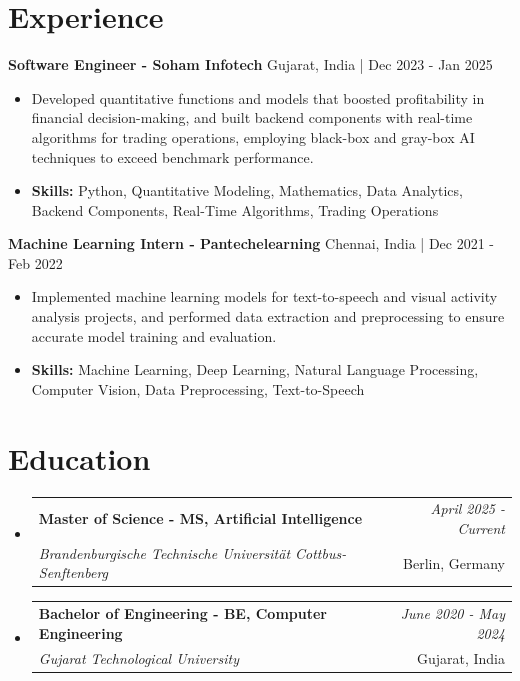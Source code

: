 \documentclass[a4paper,11pt]{article}
\makeatletter
\newcommand{\resumeSubheading}[4]{
\vspace{0.5mm}\item
    \begin{tabular*}{\linewidth}[t]{l@{\extracolsep{\fill}}r}
        \textbf{#1} & \textit{\footnotesize{#4}} \\
        \textit{\footnotesize{#3}} &  \footnotesize{#2}\\
    \end{tabular*}
    \vspace{-2.4mm}
}
\makeatother
\begin{document}
\section{\textbf{Experience}}


\vspace{1mm}
  \textbf{Software Engineer - Soham Infotech} \hfill Gujarat, India | Dec 2023 - Jan 2025
\vspace{-1.5mm} %
\begin{itemize}
  \item Developed quantitative functions and models that boosted profitability in financial decision-making, and built backend components with real-time algorithms for trading operations, employing black-box and gray-box AI techniques to exceed benchmark performance.

\vspace{-2mm}
  \item \textbf{Skills:} Python, Quantitative Modeling, Mathematics, Data Analytics, Backend Components, Real-Time Algorithms, Trading Operations
\end{itemize}

\vspace{1mm}
  \textbf{Machine Learning Intern - Pantechelearning} \hfill Chennai, India | Dec 2021 - Feb 2022
\vspace{-1.5mm} %
\begin{itemize}
  \item Implemented machine learning models for text-to-speech and visual activity analysis projects, and performed data extraction and preprocessing to ensure accurate model training and evaluation.
\vspace{-2mm}
  \item \textbf{Skills:} Machine Learning, Deep Learning, Natural Language Processing, Computer Vision, Data Preprocessing, Text-to-Speech
\end{itemize}\section{\textbf{Education}}
\vspace{-0.4mm}

\begin{itemize}[leftmargin=0.15in, label={}]
\resumeSubheading
{Master of Science - MS, Artificial Intelligence }{Berlin, Germany}
{Brandenburgische Technische Universität Cottbus-Senftenberg  }{April 2025 - Current}

\vspace{1.0mm} %
\resumeSubheading
{Bachelor of Engineering - BE, Computer Engineering  }{Gujarat, India}
{Gujarat Technological University }{June 2020 - May 2024}

\end{itemize}
\end{document}
